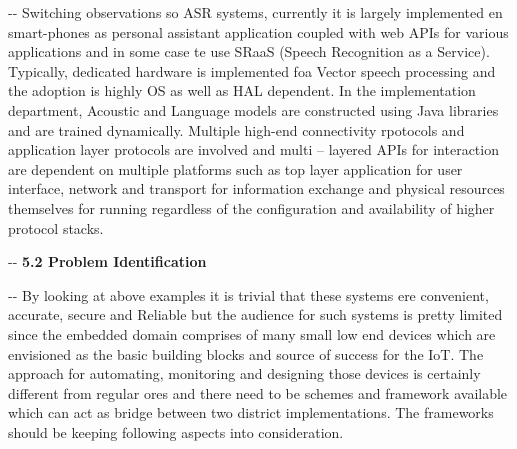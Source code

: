 \documentclass[12pt]{article}
\makeatletter
\newenvironment{indentation}[3]%
	{\par\setlength{\parindent}{#3}
	\setlength{\leftmargin}{#1}       \setlength{\rightmargin}{#2}%
	\advance\linewidth -\leftmargin       \advance\linewidth -\rightmargin%
	\advance\@totalleftmargin\leftmargin  \@setpar{{\@@par}}%
	\parshape 1\@totalleftmargin \linewidth\ignorespaces}{\par}%
\makeatother
\begin{document}
\begin{indentation}{0pt}{0pt}{0pt}
Switching observations so ASR systems, currently it is largely implemented en
smart-phones as personal assistant application coupled with web APIs for various
applications and in some case te use SRaaS (Speech Recognition as a Service).
Typically, dedicated hardware is implemented foa Vector speech processing and the
adoption is highly OS as well as HAL dependent. In the implementation department,
Acoustic and Language models are constructed using Java libraries and are trained
dynamically. Multiple high-end connectivity rpotocols and application layer
protocols are involved and multi -- layered APIs for interaction are dependent on
multiple platforms such as top layer application for user interface, network and
transport for information exchange and physical resources themselves for running
regardless of the configuration and availability of higher protocol stacks.
\end{indentation}
\pagebreak
\begin{indentation}{0pt}{0pt}{0pt}
\textbf{{\large 5.2 Problem Identification}}
\end{indentation}
\smallskip
\begin{indentation}{0pt}{0pt}{0pt}
By looking at above examples it is trivial that these systems ere convenient,
accurate, secure and Reliable but the audience for such systems is pretty limited
since the embedded domain comprises of many small low end devices which are
envisioned as the basic building blocks and source of success for the IoT.  The
approach for automating, monitoring and designing those devices is certainly
different from regular ores and there need to be schemes and framework available
which can act as bridge between two district implementations. The frameworks
should be keeping following aspects into consideration.
\end{indentation}
\end{document}
